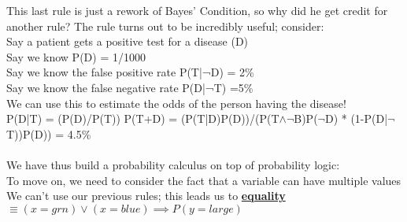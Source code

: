 \documentclass[../../lecture_notes.tex]{subfiles}
\begin{document}
\noindent This last rule is just a rework of Bayes' Condition, so why did he get credit for another rule?
The rule turns out to be incredibly useful; consider:\\
	\indent Say a patient gets a positive test for a disease (D)\\
	\indent Say we know P(D) = 1/1000\\
	\indent Say we know the false positive rate P(T|¬D) = 2\%\\
	\indent Say we know the false negative rate P(D|¬T) =5\%\\
	\indent We can use this to estimate the odds of the person having the disease!\\
	\indent \indent P(D|T) = (P(D)/P(T)) P(T+D) 
		= (P(T|D)P(D))/(P(T$\land\neg$B)P($\neg$D) * (1-P(D|$\neg$T))P(D)) = 4.5\%\\
\\
We have thus build a probability calculus on top of probability logic:\\
\indent To move on, we need to consider the fact that a variable can have multiple values\\
We can’t use our previous rules; this leads us to \textbf{\underline{equality}}
	$\equiv (x = grn) \lor (x = blue) \implies P(y=large)$
\end{document}
